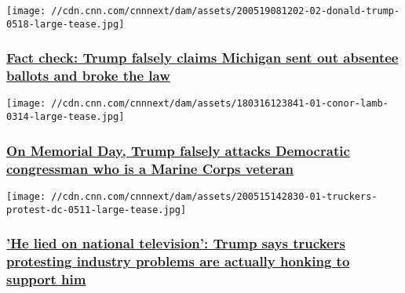 \href{/2020/05/20/politics/fact-check-trump-michigan-nevada-ballots-voting/index.html}{}

\texttt{[image: //cdn.cnn.com/cnnnext/dam/assets/200519081202-02-donald-trump-0518-large-tease.jpg]}

\hypertarget{fact-check-trump-falsely-claims-michigan-sent-out-absentee-ballots-and-broke-the-law}{%
\subsubsection{\texorpdfstring{\href{/2020/05/20/politics/fact-check-trump-michigan-nevada-ballots-voting/index.html}{Fact
check: Trump falsely claims Michigan sent out absentee ballots and broke
the
law}}{Fact check: Trump falsely claims Michigan sent out absentee ballots and broke the law}}\label{fact-check-trump-falsely-claims-michigan-sent-out-absentee-ballots-and-broke-the-law}}

\href{/2020/05/26/politics/fact-check-trump-conor-lamb-pelosi/index.html}{}

\texttt{[image: //cdn.cnn.com/cnnnext/dam/assets/180316123841-01-conor-lamb-0314-large-tease.jpg]}

\hypertarget{on-memorial-day-trump-falsely-attacks-democratic-congressman-who-is-a-marine-corps-veteran}{%
\subsubsection{\texorpdfstring{\href{/2020/05/26/politics/fact-check-trump-conor-lamb-pelosi/index.html}{On
Memorial Day, Trump falsely attacks Democratic congressman who is a
Marine Corps
veteran}}{On Memorial Day, Trump falsely attacks Democratic congressman who is a Marine Corps veteran}}\label{on-memorial-day-trump-falsely-attacks-democratic-congressman-who-is-a-marine-corps-veteran}}

\href{/2020/05/15/politics/fact-check-trump-trucker-protest/index.html}{}

\texttt{[image: //cdn.cnn.com/cnnnext/dam/assets/200515142830-01-truckers-protest-dc-0511-large-tease.jpg]}

\hypertarget{he-lied-on-national-television-trump-says-truckers-protesting-industry-problems-are-actually-honking-to-support-him}{%
\subsubsection{\texorpdfstring{\href{/2020/05/15/politics/fact-check-trump-trucker-protest/index.html}{'He
lied on national television': Trump says truckers protesting industry
problems are actually honking to support
him}}{'He lied on national television': Trump says truckers protesting industry problems are actually honking to support him}}\label{he-lied-on-national-television-trump-says-truckers-protesting-industry-problems-are-actually-honking-to-support-him}}

